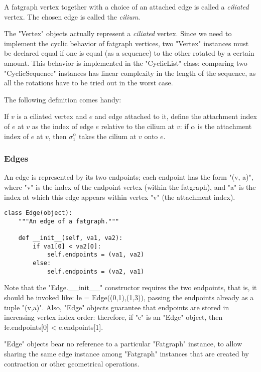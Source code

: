 \begin{definition}
  A fatgraph vertex together with a choice of an attached edge is
  called a \emph{ciliated} vertex.  The chosen edge is called the
  \emph{cilium}.
\end{definition}
The "Vertex" objects actually represent a \emph{ciliated} vertex.
Since we need to implement the cyclic behavior of fatgraph vertices,
two "Vertex" instances must be declared equal if one is equal (as a
sequence) to the other rotated by a certain amount.  This behavior is
implemented in the "CyclicList" class: comparing two
"CyclicSequence" instances has linear complexity in the length of
the sequence, as all the rotations have to be tried out in the worst
case.

The following definition comes handy:
\begin{definition}
  If $v$ is a ciliated vertex and $e$ and edge attached to it, define
  the attachment index of $e$ at $v$ as the index of edge $e$ relative
  to the cilium at $v$: if $\alpha$ is the attachment index of $e$ at
  $v$, then $\sigma_1^\alpha$ takes the cilium at $v$ onto $e$.
\end{definition}


\subsubsection{Edges}
\label{sec:edges}

An edge is represented by its two endpoints; each endpoint has the
form "(v, a)", where "v" is the index of the endpoint vertex
(within the fatgraph), and "a" is the index at which this edge
appears within vertex "v" (the attachment index).
\begin{lstlisting}
class Edge(object):
    """An edge of a fatgraph."""

    def __init__(self, va1, va2):
        if va1[0] < va2[0]:
            self.endpoints = (va1, va2)
        else:
            self.endpoints = (va2, va1)

\end{lstlisting}
Note that the "Edge.__init__" constructor requires the two
endpoints, that is, it should be invoked like: 
\l{e = Edge((0,1),(1,3))}, passing the endpoints already as a tuple 
"(v,a)".  Also, "Edge" objects guarantee that endpoints are stored in
increasing vertex index order: therefore, if "e" is an "Edge"
object, then \l{e.endpoints[0] < e.endpoints[1]}.

"Edge" objects bear no reference to a particular "Fatgraph" instance,
to allow sharing the same edge instance among "Fatgraph" instances that are
created by contraction or other geometrical operations.

